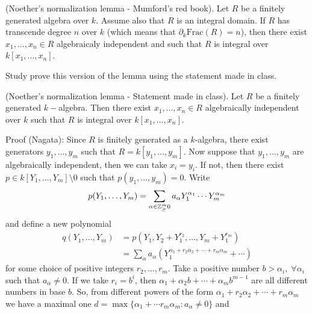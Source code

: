 \begin{dang}
\begin{lemma}
    (Noether's normalization lemma - Mumford's red book). Let $R$ be a finitely generated algebra over $k$. Assume also that $R$ is an integral domain.
    If $R$ has transcende degree $n$ over $k$ (which means that $\partial_k\text{Frac}(R)=n$), then 
    there exist $x_1,\dots, x_n\in R$ algebraicaly independent and such that $R$ is integral 
    over $k[x_1,\dots,x_n]$.
\end{lemma}
\end{dang}
\TODO Study prove this version of the lemma using the statement made in class.

\begin{dang}
    \begin{lemma}\label{lemma : Noether normalization}
        (Noether's normalization lemma - Statement made in class). Let $R$ be a finitely generated 
        $k-$algebra. Then there exist $x_1,\dots,x_n\in R$ algebraically independent over $k$ such that 
        $R$ is integral over $k[x_1,\dots,x_n]$.
    \end{lemma}
\end{dang}
Proof (Nagata): Since $R$ is finitely generated as a $k$-algebra, there exist generators $y_1,\dots,y_m$ such that 
$R= k[y_1,\dots, y_m]$. Now suppose that $y_1,\dots, y_m$ are algebraically independent, then we can take $x_i = y_i$. 
If not, then there exist $p\in k[Y_1,\dots, Y_m]\setminus0$ such that $p(y_1,\dots,y_m)=0$. Write 
\begin{equation}
    p(Y_1,\dots,Y_m)=\sum_{\alpha\in\mathbb{Z}^m_\geq0}a_\alpha Y_1^{\alpha_1}\cdots Y_m^{\alpha_m}
\end{equation}
and define a new polynomial 
\begin{equation}
    \begin{split}
        q(Y_1,\dots,Y_m) &= p(Y_1,Y_2+Y_1^{r_2},\dots, Y_m+Y_1^{r_m})\\
        &=\sum_\alpha a_\alpha(Y_1^{\alpha_1+r_2\alpha_2+\cdots+r_m\alpha_m}+\cdots) 
    \end{split}
\end{equation}
for some choice of positive integers $r_2,\dots,r_m$. Take a positive number $b>\alpha_i,\;\forall \alpha_i$ such that 
$a_\alpha\neq0$. If we take $r_i = b^i$, then $\alpha_1+\alpha_2b+\cdots +\alpha_mb^{m-1}$ are all different numbers in base $b$. 
So, from different powers of the form $\alpha_1+r_2\alpha_2+\cdots+r_m\alpha_m$ we have a maximal one 
$d=\max\{\alpha_1+\cdots r_m\alpha_m:a_\alpha\neq0\}$ and 
